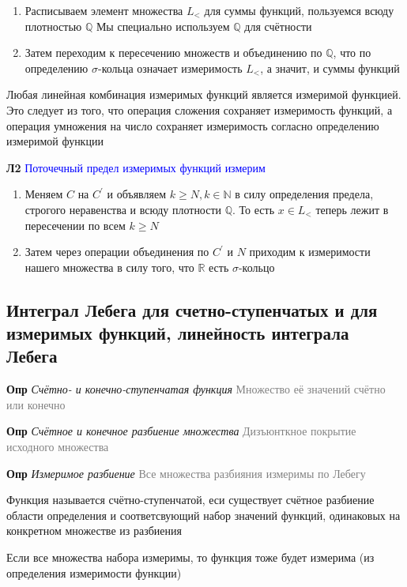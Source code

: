 \begin{enumerate}
    \item Расписываем элемент множества $L_<$ для суммы функций, пользуемся всюду плотностью $\mathbb{Q}$
    Мы специально используем $\mathbb{Q}$ для счётности
    \item Затем переходим к пересечению множеств и объединению по $\mathbb{Q}$, что по определению $\sigma$-кольца означает
    измеримость $L_<$, а значит, и суммы функций
\end{enumerate}

Любая линейная комбинация измеримых функций является измеримой функцией.
Это следует из того, что операция сложения сохраняет измеримость функций, а операция умножения на число сохраняет
измеримость согласно определению измеримой функции

\textbf{Л2} \textcolor{blue}{Поточечный предел измеримых функций измерим}

\begin{enumerate}
    \item Меняем $C$ на $C^{'}$ и объявляем $k \geq N, k \in \mathbb{N}$ в силу определения предела, строгого
    неравенства и всюду плотности $\mathbb{Q}$.
    То есть $x \in L_<$ теперь лежит в пересечении по всем $k \geq N$
    \item Затем через операции объединения по $C^{'}$ и $N$ приходим к измеримости нашего множества в силу того, что
    $\mathbb{R}$ есть $\sigma$-кольцо
\end{enumerate}

\subsection{Интеграл Лебега для счетно-ступенчатых и для измеримых функций, линейность интеграла Лебега}

\textbf{Опр} \textit{Счётно- и конечно-ступенчатая функция} \textcolor{gray}{Множество её значений счётно или
конечно}

\textbf{Опр} \textit{Счётное и конечное разбиение множества} \textcolor{gray}{Дизъюнткное покрытие
исходного множества}

\textbf{Опр} \textit{Измеримое разбиение} \textcolor{gray}{Все множества разбияния измеримы по Лебегу}

Функция называется счётно-ступенчатой, еси существует счётное разбиение области определения и соответсвующий
набор значений функций, одинаковых на конкретном множестве из разбиения

Если все множества набора измеримы, то функция тоже будет измерима (из определения измеримости функции)

